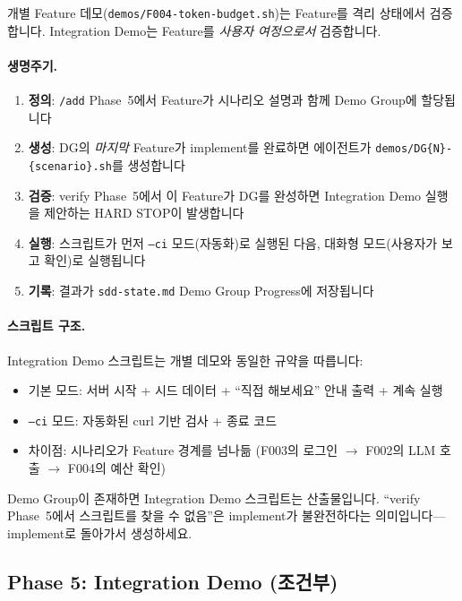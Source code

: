 \documentclass[11pt,a4paper,openright,twoside]{report}
\newcommand{\cmd}[1]{\texttt{/#1}}
\newcommand{\file}[1]{\texttt{#1}}
\begin{document}
개별 Feature 데모(\file{demos/F004-token-budget.sh})는 Feature를 격리 상태에서 검증합니다. Integration Demo는 Feature를 \emph{사용자 여정으로서} 검증합니다.

\paragraph{생명주기.}
\begin{enumerate}[nosep]
  \item \textbf{정의}: \cmd{add} Phase~5에서 Feature가 시나리오 설명과 함께 Demo Group에 할당됩니다
  \item \textbf{생성}: DG의 \emph{마지막} Feature가 implement를 완료하면 에이전트가 \file{demos/DG\{N\}-\{scenario\}.sh}를 생성합니다
  \item \textbf{검증}: verify Phase~5에서 이 Feature가 DG를 완성하면 Integration Demo 실행을 제안하는 HARD STOP이 발생합니다
  \item \textbf{실행}: 스크립트가 먼저 \texttt{--ci} 모드(자동화)로 실행된 다음, 대화형 모드(사용자가 보고 확인)로 실행됩니다
  \item \textbf{기록}: 결과가 \file{sdd-state.md} Demo Group Progress에 저장됩니다
\end{enumerate}

\paragraph{스크립트 구조.}
Integration Demo 스크립트는 개별 데모와 동일한 규약을 따릅니다:
\begin{itemize}[nosep]
  \item 기본 모드: 서버 시작 + 시드 데이터 + ``직접 해보세요'' 안내 출력 + 계속 실행
  \item \texttt{--ci} 모드: 자동화된 curl 기반 검사 + 종료 코드
  \item 차이점: 시나리오가 Feature 경계를 넘나듦 (F003의 로그인 $\rightarrow$ F002의 LLM 호출 $\rightarrow$ F004의 예산 확인)
\end{itemize}

\begin{warnbox}
Demo Group이 존재하면 Integration Demo 스크립트는 산출물입니다. ``verify Phase~5에서 스크립트를 찾을 수 없음''은 implement가 불완전하다는 의미입니다---implement로 돌아가서 생성하세요.
\end{warnbox}

\subsection{Phase 5: Integration Demo (조건부)}
\end{document}
